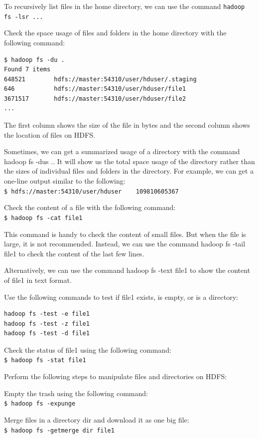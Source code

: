 To recursively list files in the home directory, we can use the command \verb|hadoop fs -lsr ...|

Check the space usage of files and folders in the home directory with the following command:
\begin{verbatim}
$ hadoop fs -du .
Found 7 items
648521        hdfs://master:54310/user/hduser/.staging
646           hdfs://master:54310/user/hduser/file1
3671517       hdfs://master:54310/user/hduser/file2
...
\end{verbatim}

The first column shows the size of the file in bytes and the second column shows the location of files on HDFS.

Sometimes, we can get a summarized usage of a directory with the command hadoop fs -dus .. It will show us the total space usage of the directory rather than the sizes of individual files and folders in the directory. For example, we can get a one-line output similar to the following: \\
\verb|$ hdfs://master:54310/user/hduser    109810605367|

Check the content of a file with the following command: \\
\verb|$ hadoop fs -cat file1|

This command is handy to check the content of small files. But when the file is large, it is not recommended. Instead, we can use the command hadoop fs -tail file1 to check the content of the last few lines.

Alternatively, we can use the command hadoop fs -text file1 to show the content of file1 in text format.

Use the following commands to test if file1 exists, is empty, or is a directory:
\begin{verbatim}
hadoop fs -test -e file1
hadoop fs -test -z file1
hadoop fs -test -d file1
\end{verbatim}

Check the status of file1 using the following command: \\
\verb|$ hadoop fs -stat file1|

Perform the following steps to manipulate files and directories on HDFS:

Empty the trash using the following command: \\
\verb|$ hadoop fs -expunge|

Merge files in a directory dir and download it as one big file:\\
\verb|$ hadoop fs -getmerge dir file1|

